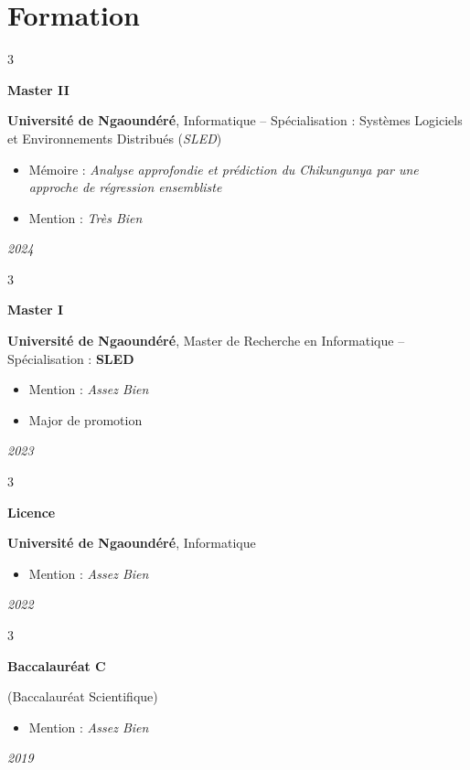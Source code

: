 \documentclass[10pt, letterpaper]{article}
\newenvironment{highlights}{
	\begin{itemize}[
		topsep=0.10 cm,
		parsep=0.10 cm,
		partopsep=0pt,
		itemsep=0pt,
		leftmargin=0.4 cm + 10pt
		]
	}{
	\end{itemize}
} %
\newenvironment{threecolentry}[3][]{
	\onecolentry
	\def\thirdColumn{#3}
	\setcolumnwidth{2cm, \fill, 4.5 cm} %
	\begin{paracol}{3}
		{\raggedright #2} \switchcolumn
	}{
		\switchcolumn \raggedleft \thirdColumn
	\end{paracol}
	\endonecolentry
} %
\begin{document}
	\section{Formation}
	\begin{threecolentry}{\textbf{Master II}}{\textit{2024}}
		\textbf{Université de Ngaoundéré}, Informatique – Spécialisation : Systèmes Logiciels et Environnements Distribués (\textit{SLED})
		\begin{highlights}
			\item Mémoire : \textit{Analyse approfondie et prédiction du Chikungunya par une approche de régression ensembliste}
			\item Mention : \textit{Très Bien}
		\end{highlights}
	\end{threecolentry}
	\vspace{0.2 cm}
	\begin{threecolentry}{\textbf{Master I}}{\textit{2023}}
		\textbf{Université de Ngaoundéré}, Master de Recherche en Informatique – Spécialisation : \textbf{SLED}
		\begin{highlights}
			\item Mention : \textit{Assez Bien}
			\item Major de promotion
		\end{highlights}
	\end{threecolentry}
	\vspace{0.2 cm}
	\begin{threecolentry}{\textbf{Licence}}{\textit{2022}} %
		\textbf{Université de Ngaoundéré}, Informatique
		\begin{highlights}
			\item Mention : \textit{Assez Bien}
		\end{highlights}
	\end{threecolentry}
	\vspace{0.2 cm}
	\begin{threecolentry}{\textbf{Baccalauréat C}}{\textit{2019}} %
		(Baccalauréat Scientifique) %
		\begin{highlights}
			\item Mention : \textit{Assez Bien}
		\end{highlights}
	\end{threecolentry}
	
\end{document}

